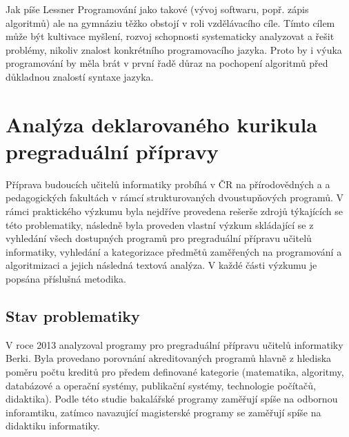 \documentclass[FP,DP]{tulthesis}
\begin{document}
{{{{{{{Jak píše Lessner Programování jako takové (vývoj softwaru, popř. zápis algoritmů) ale na gymnáziu těžko obstojí v roli vzdělávacího cíle. Tímto cílem může být
kultivace myšlení, rozvoj schopnosti systematicky analyzovat a řešit problémy, nikoliv znalost konkrétního programovacího jazyka. Proto by i výuka programování by měla brát v první řadě důraz na pochopení algoritmů před důkladnou znalostí syntaxe jazyka.
\chapter{Analýza deklarovaného kurikula pregraduální přípravy}
Příprava budoucích učitelů informatiky probíhá v ČR na přírodovědných a a pedagogických fakultách v rámcí strukturovaných dvoustupňových programů. V rámci praktického výzkumu byla nejdříve provedena rešerše zdrojů týkajících se této problematiky, následně byla proveden vlastní výzkum skládající se z vyhledání všech dostupných programů pro pregraduální přípravu učitelů informatiky, vyhledání a kategorizace předmětů zaměřených na programování a algoritmizaci a jejich následná textová analýza. V každé části výzkumu je popsána příslušná metodika.

\section{Stav problematiky}
V roce 2013 analyzoval programy pro pregraduální přípravu učitelů informatiky Berki. Byla provedano porovnání akreditovaných programů  hlavně z hlediska poměru počtu kreditů pro předem definované kategorie (matematika, algoritmy, databázové a operační systémy, publikační systémy, technologie počítačů, didaktika). Podle této studie bakalářské programy zaměřují spíše na odbornou inforamtiku, zatímco navazující magisterské programy se zaměřují spíše na didaktiku informatiky. 

}}}}}}}
\end{document}
